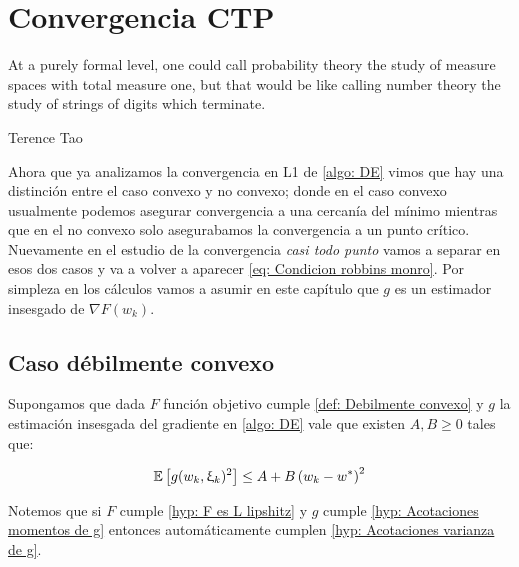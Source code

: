 \chapter{Convergencia CTP }\label{ch:convergenciaCTP}

\epigraph{At a purely formal level, one could call probability theory the study of measure spaces with total measure one, but that would be like calling number theory the study of strings of digits which terminate.}{Terence Tao}

Ahora que ya analizamos la convergencia en L1 de \ref{algo: DE} vimos que hay una distinci\'on entre el caso convexo y no convexo; donde en el caso convexo usualmente podemos asegurar convergencia a una cercan\'ia del m\'inimo mientras que en el no convexo solo asegurabamos la convergencia a un punto cr\'itico. Nuevamente en el estudio de la convergencia \textit{casi todo punto} vamos a separar en esos dos casos y va a volver a aparecer \ref{eq: Condicion robbins monro}. Por simpleza en los c\'alculos vamos a asumir en este cap\'itulo que $g$ es un estimador insesgado de $\nabla F(w_k)$.

\section{Caso d\'ebilmente convexo}

\begin{hyp}
	\label{hyp: Acotaciones varianza de g}
	Supongamos que dada $F$ funci\'on objetivo cumple \ref{def: Debilmente convexo} y $g$ la estimaci\'on insesgada del gradiente en \ref{algo: DE} vale que existen $A,B \geq 0$ tales que:
	
	\begin{equation*}
		\label{eq: Segundo momento acotado de g insesgado}
		\mathbb{E} \left[g(w_k, \upxi_{k})^2\right] \leq A + B \left(w_k - w^*\right)^2
	\end{equation*}
	
\end{hyp}

\begin{remark}
	Notemos que si $F$ cumple \ref{hyp: F es L lipshitz} y $g$ cumple \ref{hyp: Acotaciones momentos de g} entonces autom\'aticamente cumplen \ref{hyp: Acotaciones varianza de g}.
\end{remark}

